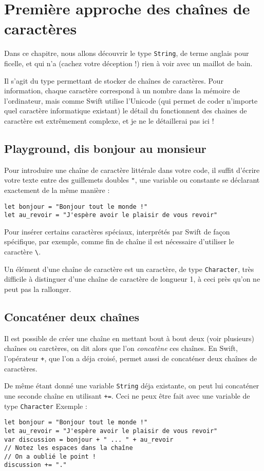 \chapter{Première approche des chaînes de caractères}
Dans ce chapitre, nous allons découvrir le type \texttt{String}, de terme anglais pour ficelle, et qui n'a (cachez votre déception !) rien à voir avec un maillot de bain.

Il s'agit du type permettant de stocker de chaînes de caractères. Pour information, chaque caractère correspond à un nombre dans la mémoire de l'ordinateur, mais comme Swift utilise l'Unicode (qui permet de coder n'importe quel caractère informatique existant) le détail du fonctionnent des chaines de caractère est extrêmement complexe, et je ne le détaillerai pas ici !
\section{Playground, dis bonjour au monsieur}
Pour introduire une chaîne de caractère littérale dans votre code, il suffit d'écrire votre texte entre des guillemets doubles \verb'"', une variable ou constante se déclarant exactement de la même manière :
\begin{listing}[h]
\begin{verbatim}
let bonjour = "Bonjour tout le monde !"
let au_revoir = "J'espère avoir le plaisir de vous revoir"
\end{verbatim}
\end{listing}
Pour insérer certains caractères spéciaux, interprétés par Swift de façon spécifique, par exemple, comme fin de chaîne il est nécessaire d'utiliser le caractère \verb"\".

Un élément d'une chaîne de caractère est un caractère, de type \texttt{Character}, très difficile à distinguer d'une chaîne de caractère de longueur 1, à ceci près qu'on ne peut pas la rallonger.
\section{Concaténer deux chaînes}
Il est possible de créer une chaîne en mettant bout à bout deux (voir plusieurs) chaînes ou carctères, on dit alors que l'on \emph{concatène} ces chaînes. En Swift, l'opérateur \verb"+", que l'on a déja croisé, permet aussi de concaténer deux chaînes de caractères.

De même étant donné une variable \texttt{String} déja existante, on peut lui concaténer une seconde chaîne en utilisant \verb"+=".
Ceci ne peux être fait avec une variable de type \texttt{Character}
Exemple :
\begin{listing}[h]
\begin{verbatim}
let bonjour = "Bonjour tout le monde !"
let au_revoir = "J'espère avoir le plaisir de vous revoir"
var discussion = bonjour + " ... " + au_revoir
// Notez les espaces dans la chaîne
// On a oublié le point !
discussion += "."
\end{verbatim}
\end{listing}
